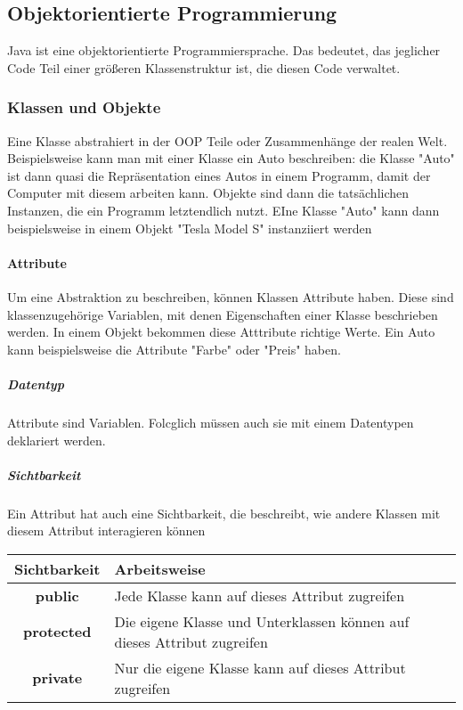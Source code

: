 \documentclass{article}
\begin{document}
	\subsection{Objektorientierte Programmierung}
	Java ist eine objektorientierte Programmiersprache. Das bedeutet, das jeglicher Code Teil einer größeren Klassenstruktur ist, die diesen Code verwaltet.

	\subsubsection{Klassen und Objekte}
	Eine Klasse abstrahiert in der OOP Teile oder Zusammenhänge der realen Welt. Beispielsweise kann man mit einer Klasse ein Auto beschreiben: die Klasse "Auto" ist dann quasi die Repräsentation eines Autos in einem Programm, damit der Computer mit diesem arbeiten kann. Objekte sind dann die tatsächlichen Instanzen, die ein Programm letztendlich nutzt. EIne Klasse "Auto" kann dann beispielsweise in einem Objekt "Tesla Model S" instanziiert werden

	\paragraph{Attribute}
	Um eine Abstraktion zu beschreiben, können Klassen Attribute haben. Diese sind klassenzugehörige Variablen, mit denen Eigenschaften einer Klasse beschrieben werden. In einem Objekt bekommen diese Atttribute richtige Werte. Ein Auto kann beispielsweise die Attribute "Farbe" oder "Preis" haben.

	\subparagraph{Datentyp}
	Attribute sind Variablen. Folcglich müssen auch sie mit einem Datentypen deklariert werden.

	\subparagraph{Sichtbarkeit}
	Ein Attribut hat auch eine Sichtbarkeit, die beschreibt, wie andere Klassen mit diesem Attribut interagieren können

	\begin{center}
		\def\arraystretch{1.1}
		\begin{tabular}{ | c | l | }
			\hline
			\textbf{Sichtbarkeit} 	& \textbf{Arbeitsweise} \\
			\hline
			\hline
			\textbf{public} 		& Jede Klasse kann auf dieses Attribut zugreifen \\
			\textbf{protected} 		& Die eigene Klasse und Unterklassen können auf dieses Attribut zugreifen \\
			\textbf{private} 		& Nur die eigene Klasse kann auf dieses Attribut zugreifen \\
			\hline
		\end{tabular}
	\end{center}
\end{document}
